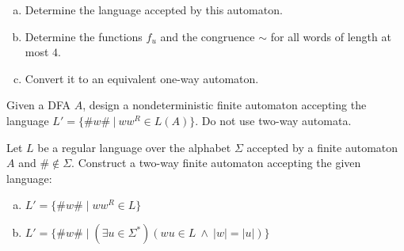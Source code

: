 \documentclass[a4paper,12pt]{amsart}
\begin{document}
\begin{problem}
\begin{multicols}{2}
    \end{multicols}

    \begin{enumerate}[(a)]
        \item Determine the language accepted by this automaton.
        \item Determine the functions $f_u$ and the congruence $\sim$ for all words of length at most $4$.
        \item Convert it to an equivalent one-way automaton.
    \end{enumerate}

\end{problem}


\medskip\begin{problem}

    Given a DFA $A$, design a nondeterministic finite automaton accepting the language $L'=\{\#w\#\ |\ ww^R\in L(A)\}$. Do not use two-way automata.

\end{problem}


\medskip\begin{problem}

    Let $L$ be a regular language over the alphabet $\Sigma$ accepted by a finite automaton $A$ and $\#\notin\Sigma$. Construct a two-way finite automaton accepting the given language: 

    \begin{enumerate}[(a)]
        \item $L' = \{\#w\#\mid ww^R \in L\}$
        \item $L' = \{\#w\#\mid (\exists u \in\Sigma^*)( wu \in L\ \wedge \ |w|=|u|)\}$
    \end{enumerate}

\end{problem}
\end{document}
